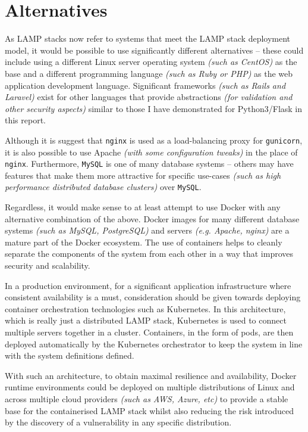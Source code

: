 \section{Alternatives}
As LAMP stacks now refer to systems that meet the LAMP stack deployment model, it would be possible to use significantly different alternatives -- these could include using a different Linux server operating system \textit{(such as CentOS)} as the base and a different programming language \textit{(such as Ruby or PHP)} as the web application development language. Significant frameworks \textit{(such as Rails and Laravel)} exist for other languages that provide abstractions \textit{(for validation and other security aspects)} similar to those I have demonstrated for Python3/Flask in this report.

Although it is suggest that \texttt{nginx} is used as a load-balancing proxy for \texttt{gunicorn}, it is also possible to use Apache \textit{(with some configuration tweaks)} in the place of \texttt{nginx}. Furthermore, \texttt{MySQL} is one of many database systems -- others may have features that make them more attractive for specific use-cases \textit{(such as high performance distributed database clusters)} over \texttt{MySQL}.

Regardless, it would make sense to at least attempt to use Docker with any alternative combination of the above. Docker images for many different database systems \textit{(such as MySQL, PostgreSQL)} and servers \textit{(e.g. Apache, nginx)} are a mature part of the Docker ecosystem. The use of containers helps to cleanly separate the components of the system from each other in a way that improves security and scalability.

In a production environment, for a significant application infrastructure where consistent availability is a must, consideration should be given towards deploying container orchestration technologies such as Kubernetes. In this architecture, which is really just a distributed LAMP stack, Kubernetes is used to connect multiple servers together in a cluster. Containers, in the form of pods, are then deployed automatically by the Kubernetes orchestrator to keep the system in line with the system definitions defined.

With such an architecture, to obtain maximal resilience and availability, Docker runtime environments could be deployed on multiple distributions of Linux and across multiple cloud providers \textit{(such as AWS, Azure, etc)} to provide a stable base for the containerised LAMP stack whilst also reducing the risk introduced by the discovery of a vulnerability in any specific distribution.
